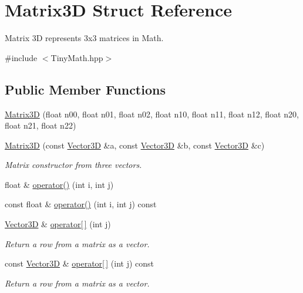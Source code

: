 \hypertarget{structMatrix3D}{}\section{Matrix3D Struct Reference}
\label{structMatrix3D}


Matrix 3D represents 3x3 matrices in Math.  




{\ttfamily \#include $<$Tiny\+Math.\+hpp$>$}

\subsection*{Public Member Functions}
\begin{DoxyCompactItemize}
\item 
\hyperlink{structMatrix3D_a2456e868e08fc543ac0933a7e1457856}{Matrix3D} (float n00, float n01, float n02, float n10, float n11, float n12, float n20, float n21, float n22)
\item 
\mbox{\label{structMatrix3D_a1e319e164a50a609d623b210a6526162}} 
\hyperlink{structMatrix3D_a1e319e164a50a609d623b210a6526162}{Matrix3D} (const \hyperlink{structVector3D}{Vector3D} \&a, const \hyperlink{structVector3D}{Vector3D} \&b, const \hyperlink{structVector3D}{Vector3D} \&c)
\begin{DoxyCompactList}\small\item\em Matrix constructor from three vectors. \end{DoxyCompactList}\item 
float \& \hyperlink{structMatrix3D_ae44ce12f56a97fd58842e183d189227d}{operator()} (int i, int j)
\item 
const float \& \hyperlink{structMatrix3D_ad571200a0fa09b5b2cea2f86babd462d}{operator()} (int i, int j) const
\item 
\mbox{\label{structMatrix3D_a044b500a5ee531998d7bf1b46a257ae0}} 
\hyperlink{structVector3D}{Vector3D} \& \hyperlink{structMatrix3D_a044b500a5ee531998d7bf1b46a257ae0}{operator\mbox{[}$\,$\mbox{]}} (int j)
\begin{DoxyCompactList}\small\item\em Return a row from a matrix as a vector. \end{DoxyCompactList}\item 
\mbox{\label{structMatrix3D_ab6efb2cdaa9d4d68061e566062d6c5e2}} 
const \hyperlink{structVector3D}{Vector3D} \& \hyperlink{structMatrix3D_ab6efb2cdaa9d4d68061e566062d6c5e2}{operator\mbox{[}$\,$\mbox{]}} (int j) const
\begin{DoxyCompactList}\small\item\em Return a row from a matrix as a vector. \end{DoxyCompactList}\end{DoxyCompactItemize}



